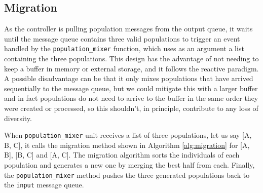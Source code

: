 \documentclass[runningheads]{llncs}
\begin{document}
\subsection{Migration}
\label{migration}

As the controller is pulling population messages from the output queue, it waits
until the message queue contains three valid populations to trigger an event handled by the
\texttt{population\_mixer} function, which uses as an argument a list
containing the three populations. This design has the advantage of not needing to keep a
buffer in memory or external storage, and it follows the reactive paradigm. A
possible disadvantage can be that it only mixes populations that have
arrived sequentially to the message queue, but we
could mitigate this with a larger buffer and in fact populations do
not need to arrive to the buffer in the same order they were created
or processed, so this shouldn't, in principle, contribute to any loss
of diversity.

When \texttt{population\_mixer} unit receives a list of three populations, let us say
[A, B, C], it calls the migration method shown in Algorithm \ref{alg:migration}
for [A, B], [B, C] and [A, C]. The migration algorithm sorts the
individuals of each population and generates a new one by
merging the best half from each. Finally, the \texttt{population\_mixer} 
method pushes the three generated populations back to the \texttt{input} message queue.
\end{document}
